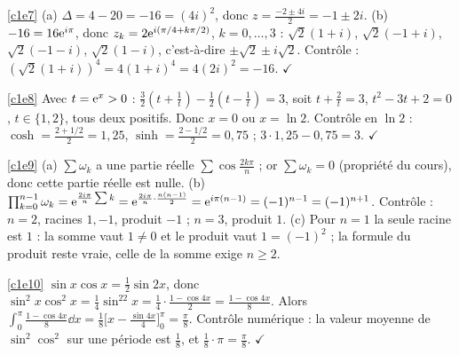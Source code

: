 \begin{corrige}{\ref{c1e7}}
(a) $\Delta=4-20=-16=(4i)^2$, donc $z=\frac{-2\pm4i}2=-1\pm2i$. (b) $-16=16\mathrm{e}^{i\pi}$, donc $z_k=2\mathrm{e}^{i(\pi/4+k\pi/2)}$, $k=0,\dots,3$ : $\sqrt2(1+i)$, $\sqrt2(-1+i)$, $\sqrt2(-1-i)$, $\sqrt2(1-i)$, c'est-à-dire $\pm\sqrt2\pm i\sqrt2$. Contrôle : $(\sqrt2(1+i))^4=4(1+i)^4=4(2i)^2=-16$. $\checkmark$
\end{corrige}
\begin{corrige}{\ref{c1e8}}
Avec $t=\mathrm{e}^x>0$ : $\frac32(t+\frac1t)-\frac12(t-\frac1t)=3$, soit $t+\frac2t=3$, $t^2-3t+2=0$, $t\in\{1,2\}$, tous deux positifs. Donc $x=0$ ou $x=\ln2$. Contrôle en $\ln2$ : $\cosh=\frac{2+1/2}2=1{,}25$, $\sinh=\frac{2-1/2}2=0{,}75$ ; $3\cdot1{,}25-0{,}75=3$. $\checkmark$
\end{corrige}
\begin{corrige}{\ref{c1e9}}
(a) $\sum\omega_k$ a une partie réelle $\sum\cos\frac{2k\pi}n$ ; or $\sum\omega_k=0$ (propriété du cours), donc cette partie réelle est nulle. (b) $\prod_{k=0}^{n-1}\omega_k=\mathrm{e}^{\frac{2i\pi}n\sum k}=\mathrm{e}^{\frac{2i\pi}n\cdot\frac{n(n-1)}2}=\mathrm{e}^{i\pi(n-1)}=(-1)^{n-1}=(-1)^{n+1}$. Contrôle : $n=2$, racines $1,-1$, produit $-1$ ; $n=3$, produit $1$. (c) Pour $n=1$ la seule racine est $1$ : la somme vaut $1\ne0$ et le produit vaut $1=(-1)^2$ ; la formule du produit reste vraie, celle de la somme exige $n\ge2$.
\end{corrige}
\begin{corrige}{\ref{c1e10}}
$\sin x\cos x=\frac12\sin2x$, donc $\sin^2x\cos^2x=\frac14\sin^22x=\frac14\cdot\frac{1-\cos4x}2=\frac{1-\cos4x}8$. Alors $\int_0^\pi\frac{1-\cos4x}8\dd x=\frac18\big[x-\frac{\sin4x}4\big]_0^\pi=\frac\pi8$. Contrôle numérique : la valeur moyenne de $\sin^2\cos^2$ sur une période est $\frac18$, et $\frac18\cdot\pi=\frac\pi8$. $\checkmark$
\end{corrige}
\else{}\fi

